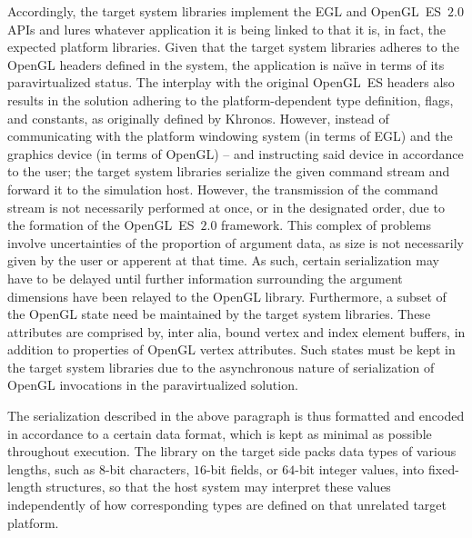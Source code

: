 Accordingly, the target system libraries implement the EGL and OpenGL~ES~$2.0$ APIs and lures whatever application it is being linked to that it is, in fact, the expected platform libraries.
Given that the target system libraries adheres to the OpenGL headers defined in the system, the application is na\"{\i}ve in terms of its paravirtualized status.
The interplay with the original OpenGL~ES headers also results in the solution adhering to the platform-dependent type definition, flags, and constants, as originally defined by Khronos.
However, instead of communicating with the platform windowing system (in terms of EGL) and the graphics device (in terms of OpenGL) -- and instructing said device in accordance to the user; the target system libraries serialize the given command stream and forward it to the simulation host.
However, the transmission of the command stream is not necessarily performed at once, or in the designated order, due to the formation of the OpenGL~ES~$2.0$ framework.
This complex of problems involve uncertainties of the proportion of argument data, as size is not necessarily given by the user or apperent at that time.
As such, certain serialization may have to be delayed until further information surrounding the argument dimensions have been relayed to the OpenGL library.
Furthermore, a subset of the OpenGL state need be maintained by the target system libraries.
These attributes are comprised by, inter alia, bound vertex and index element buffers, in addition to properties of OpenGL vertex attributes.
Such states must be kept in the target system libraries due to the asynchronous nature of serialization of OpenGL invocations in the paravirtualized solution.

The serialization described in the above paragraph is thus formatted and encoded in accordance to a certain data format, which is kept as minimal as possible throughout execution.
The library on the target side packs data types of various lengths, such as $8$-bit characters, $16$-bit fields, or $64$-bit integer values, into fixed-length structures, so that the host system may interpret these values independently of how corresponding types are defined on that unrelated target platform.



